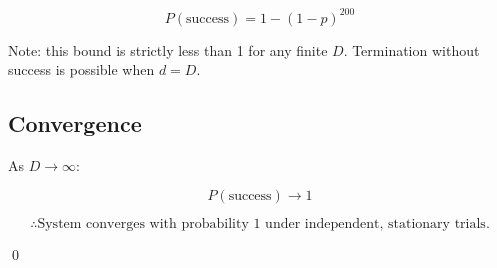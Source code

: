 \[ P(\text{success}) = 1 - (1-p)^{200} \]

Note: this bound is strictly less than 1 for any finite $D$.
Termination without success is possible when $d = D$.

\subsection*{Convergence}

As $D \rightarrow \infty$:

\[ P(\text{success}) \rightarrow 1 \]

\[ \therefore \text{System converges with probability 1 under independent, stationary trials.} \]

\qed